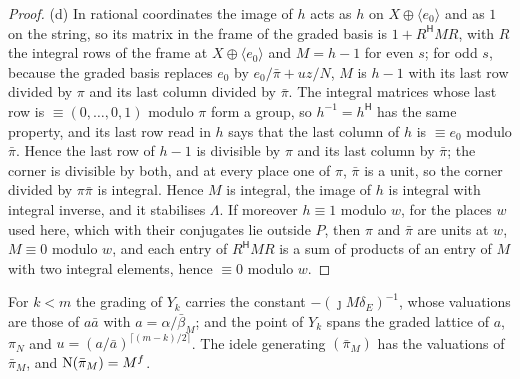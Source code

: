 \begin{proof}
(d) In rational coordinates the image of $h$ acts as $h$ on $X\oplus\langle e_0\rangle$ and as $1$ on the string, so its matrix in the frame of the graded basis is $1+R^{\mathsf H}MR$, with $R$ the integral rows of the frame at $X\oplus\langle e_0\rangle$ and $M=h-1$ for even $s$; for odd $s$, because the graded basis replaces $e_0$ by $e_0/\bar\pi+uz/N$,
$M$ is $h-1$ with its last row divided by $\pi$ and its last column divided by $\bar\pi$. The integral matrices whose last row is $\equiv(0,\dots,0,1)$ modulo $\pi$ form a group, so $h^{-1}=h^{\mathsf H}$ has the same property, and its last row read in $h$ says that the last column of $h$ is $\equiv e_0$ modulo $\bar\pi$. Hence the last row of $h-1$ is divisible by
$\pi$ and its last column by $\bar\pi$; the corner is divisible by both, and at every place one of $\pi$, $\bar\pi$ is a unit, so the corner divided by $\pi\bar\pi$ is integral. Hence $M$ is integral, the image of $h$ is integral with integral inverse, and it stabilises $\Lambda$. If moreover $h\equiv1$ modulo $w$, for the places $w$ used here, which with their conjugates lie outside $P$, then $\pi$ and $\bar\pi$ are
units at $w$, $M\equiv0$ modulo $w$, and each entry of $R^{\mathsf H}MR$ is a sum of products of an entry of $M$ with two integral elements, hence $\equiv0$ modulo $w$.
\end{proof}

\begin{proposition}\label{prop:lattice-Y}
For $k<m$ the grading of $Y_k$ carries the constant $-(\jmath M\delta_E)^{-1}$, whose valuations are those of $a\bar a$ with
$a=\alpha/\bar\beta_M$; and the point of $Y_k$ spans the graded lattice of $a$, $\pi_N$ and
$u=(a/\bar a)^{\lceil(m-k)/2\rceil}$. The idele generating $(\bar\pi_M)$ has the valuations of $\bar\pi_M$, and
$\operatorname{N}(\bar\pi_M)=M^f$.
\end{proposition}

